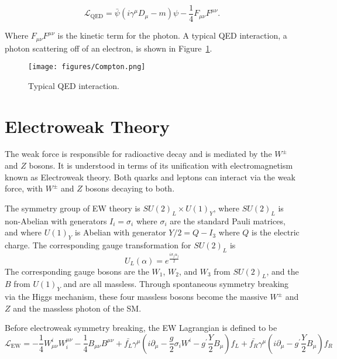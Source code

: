 \begin{equation}
\mathcal{L}_{\text{QED}} = \bar{\psi}\left(i\gamma^{\mu}D_{\mu} - m\right)\psi - \frac{1}{4}F_{\mu\nu}F^{\mu\nu}.
\end{equation} 

\noindent Where $F_{\mu\nu}F^{\mu\nu}$ is the kinetic term for the photon. A typical QED interaction, a photon scattering off of an electron, is shown in Figure~\ref{fig:FeynmanQED}.

\begin{figure}
\centering
  \texttt{[image: figures/Compton.png]}
  \caption{\label{fig:FeynmanQED} Typical QED interaction\cite{QEDFeynman}.}
\end{figure}


\section{Electroweak Theory}
\label{sec:EW}

The weak force is responsible for radioactive decay and is mediated by the $W^{\pm}$ and $Z$ bosons. It is understood in terms of its unification with electromagnetism known as Electroweak theory. Both quarks and leptons can interact via the weak force, with $W^{\pm}$ and $Z$ bosons decaying to both. 

The symmetry group of EW theory is $SU(2)_{L} \times U(1)_{Y}$, where $SU(2)_{L}$ is non-Abelian with generators $I_{i} = \sigma_{i}$ where $\sigma_{i}$ are the standard Pauli matrices, and where $U(1)_{Y}$ is Abelian with generator $Y/2 = Q - I_{3}$ where $Q$ is the electric charge. The corresponding gauge transformation for $SU(2)_{L}$ is 
\begin{equation}
U_L(\alpha) = e^{\frac{i\sigma_j\alpha_j}{2}}
\end{equation}
\noindent The corresponding gauge bosons are the $W_{1}$, $W_{2}$, and $W_{3}$ from $SU(2)_{L}$, and the $B$ from $U(1)_{Y}$ and are all massless. Through spontaneous symmetry breaking via the Higgs mechanism, these four massless bosons become the massive $W^{\pm}$ and $Z$ and the massless photon of the SM.

Before electroweak symmetry breaking, the EW Lagrangian is defined to be\cite{srednicki}
\begin{equation}
\mathcal{L}_{\text{EW}} = -\frac{1}{4}W^{i}_{\mu\nu}W^{\mu\nu}_{i} - \frac{1}{4}B_{\mu\nu}B^{\mu\nu} + \bar{f_{L}}\gamma^{\mu}\left(i\partial_{\mu} - \frac{g}{2}\sigma_{i}W^{i} - g^{\prime}\frac{Y}{2}B_{\mu}\right)f_{L} + 
\bar{f_{R}}\gamma^{\mu}\left(i\partial_{\mu} - g^{\prime}\frac{Y}{2}B_{\mu}\right)f_{R}
\end{equation}

